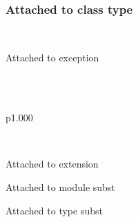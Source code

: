\label{module-Labels-class-c}\\
\label{module-Labels-class-type-cs}\begin{ocamlindent}\subsubsection{Attached to class type\label{L8}}%
\end{ocamlindent}%
\\
\label{module-Labels-exception-E}\begin{ocamlindent}Attached to exception\end{ocamlindent}%
\medbreak
\label{module-Labels-type-x}\\
\label{module-Labels-extension-decl-X}\\
\begin{ocamltabular}{p{1.000\textwidth}}\label{module-Labels-extension-X}\\
\end{ocamltabular}%
\\
\begin{ocamlindent}Attached to extension\end{ocamlindent}%
\medbreak
\label{module-Labels-module-S}\begin{ocamlindent}Attached to module subst\end{ocamlindent}%
\medbreak
\label{module-Labels-type-s}\begin{ocamlindent}Attached to type subst\end{ocamlindent}%
\medbreak
\label{module-Labels-type-u}\\

